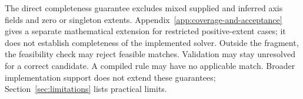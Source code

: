 The direct completeness guarantee excludes mixed supplied and inferred axis
fields and zero or singleton extents. Appendix~\ref{app:coverage-and-acceptance}
gives a separate mathematical extension for restricted positive-extent cases;
it does not establish completeness of the implemented solver. Outside the fragment, the
feasibility check may reject feasible matches. Validation may stay
unresolved for a correct candidate. A compiled rule may have no applicable
match. Broader implementation support does not extend these guarantees;
Section~\ref{sec:limitations} lists practical limits.
